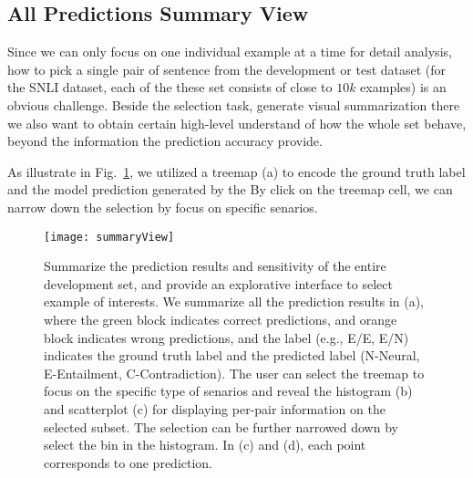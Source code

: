 \subsection{All Predictions Summary View}
\label{sec:allPairs}
Since we can only focus on one individual example at a time for detail analysis, how to pick a single pair of sentence from the development or test dataset (for the SNLI dataset, each of the these set consists of close to $10k$ examples) is an obvious challenge.
%
Beside the selection task, generate visual summarization there we also want to obtain certain high-level understand of how the whole set behave, beyond the information the prediction accuracy provide.

As illustrate in Fig.~\ref{fig:summaryView}, we utilized a treemap (a) to encode the ground truth label and the model prediction generated by the
By click on the treemap cell, we can narrow down the selection by focus on specific senarios.


\begin{figure}[htbp]
\centering
\vspace{-2mm}
 \texttt{[image: summaryView]}
 \caption{
Summarize the prediction results and sensitivity of the entire development set, and provide an explorative interface to select example of interests.
We summarize all the prediction results in (a), where the green block indicates correct predictions, and orange block indicates wrong predictions, and the label (e.g., E/E, E/N) indicates the ground truth label and the predicted label (N-Neural, E-Entailment, C-Contradiction).
%
The user can select the treemap to focus on the specific type of senarios and reveal the histogram (b) and scatterplot (c) for displaying per-pair information on the selected subset.
The selection can be further narrowed down by select the bin in the histogram.
In (c) and (d), each point corresponds to one prediction.
 }
\label{fig:summaryView}
\end{figure}

